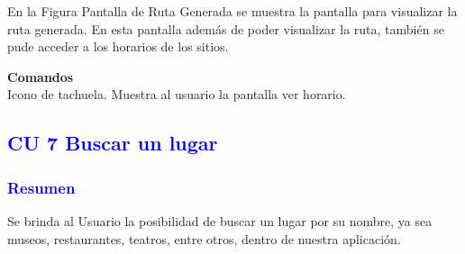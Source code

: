 En la Figura Pantalla de Ruta Generada se muestra la pantalla para visualizar la ruta generada. En esta pantalla además
de poder visualizar la ruta, también se pude acceder a los horarios de los sitios.

\textbf{Comandos} \\
Icono de tachuela. Muestra al usuario la pantalla ver horario.





\newpage
\subsection{\textcolor{blue}{CU 7 Buscar un lugar}}

\subsubsection{\textcolor{blue}{Resumen}}
Se brinda al Usuario la posibilidad de buscar un lugar por su nombre, ya sea museos, restaurantes, teatros, entre otros, dentro de nuestra aplicación.

